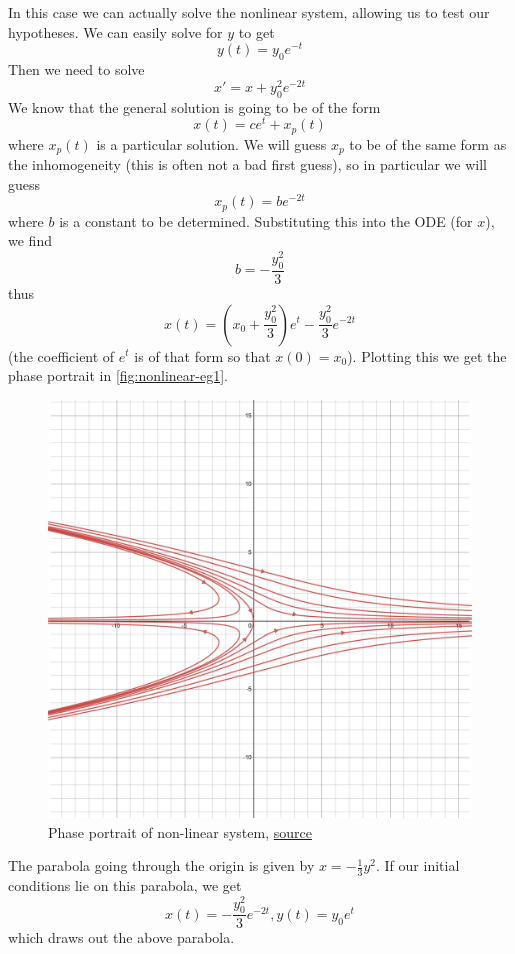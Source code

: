 In this case we can actually solve the nonlinear system, allowing us to test our hypotheses.
We can easily solve for $y$ to get
$$ y(t) = y_0 e^{-t} $$
Then we need to solve
$$ x' = x + y_0^2 e^{-2t} $$
We know that the general solution is going to be of the form
$$ x(t) = ce^{t} + x_p(t) $$
where $x_p(t)$ is a particular solution. We will guess $x_p$ to be of the same form as the inhomogeneity (this is often not a bad first guess), so in particular we will guess
$$ x_p(t) = be^{-2t} $$
where $b$ is a constant to be determined. Substituting this into the ODE (for $x$), we find
$$ b = -\frac{y_0^2}{3} $$
thus
$$ x(t) = \left( x_0 + \frac{y_0^2}{3}  \right)e^{t}  -\frac{y_0^2}{3} e^{-2t}$$
(the coefficient of $e^t$ is of that form so that $x(0) = x_0$). Plotting this we get the phase portrait in \autoref{fig:nonlinear-eg1}.

\begin{figure}[ht]
    \centering
    \includegraphics[scale=0.17]{Images/nonlinear_eg1.png}
    \caption{Phase portrait of non-linear system,  \href{https://www.desmos.com/calculator/hda60sxrdf}{source}}
    \label{fig:nonlinear-eg1}
\end{figure}

The parabola going through the origin is given by $x = -\frac{1}{3}y^2$. If our initial conditions lie on this parabola, we get
$$ x(t) = -\frac{y_0^2}{3} e^{-2t}, y(t) = y_0e^{t} $$
which draws out the above parabola.

